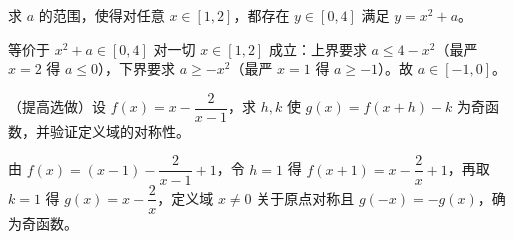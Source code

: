 \begin{problem}
求 $a$ 的范围，使得对任意 $x\in[1,2]$，都存在 $y\in[0,4]$ 满足 $y=x^2+a$。
\end{problem}
\begin{solution}
等价于 $x^2+a\in[0,4]$ 对一切 $x\in[1,2]$ 成立：上界要求 $a\le 4-x^2$（最严 $x=2$ 得 $a\le0$），下界要求 $a\ge -x^2$（最严 $x=1$ 得 $a\ge-1$）。故 $a\in[-1,0]$。
\end{solution}

\begin{problem}
（提高选做）设 $f(x)=x-\dfrac{2}{x-1}$，求 $h,k$ 使 $g(x)=f(x+h)-k$ 为奇函数，并验证定义域的对称性。
\end{problem}
\begin{solution}
由 $f(x)=(x-1)-\dfrac{2}{x-1}+1$，令 $h=1$ 得 $f(x+1)=x-\dfrac{2}{x}+1$，再取 $k=1$ 得 $g(x)=x-\dfrac{2}{x}$，定义域 $x\ne0$ 关于原点对称且 $g(-x)=-g(x)$，确为奇函数。
\end{solution}
